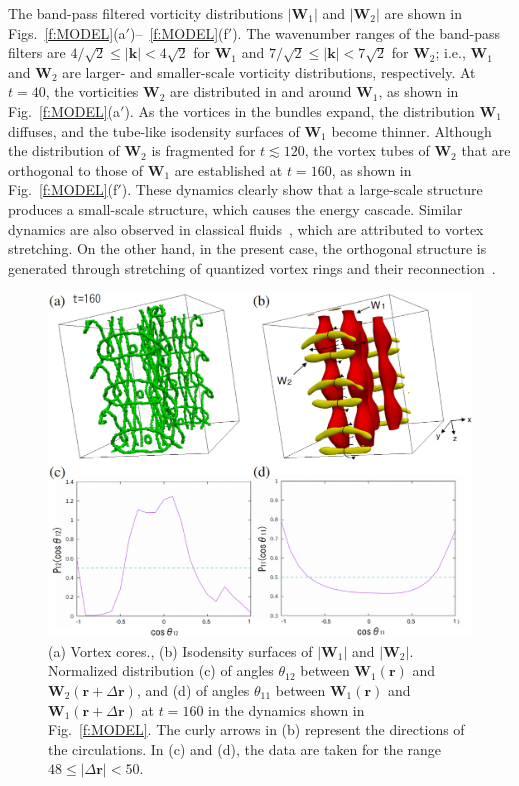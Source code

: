 \documentclass[aps,onecolumn,pra,longbibliography]{revtex4}
\begin{document}
	The band-pass filtered vorticity distributions
	$|\bm{W}_1|$ and $|\bm{W}_2|$ are shown
	in Figs.~\ref{f:MODEL}(a$'$)--~\ref{f:MODEL}(f$'$).
	The wavenumber ranges of the band-pass filters are
	$4/\sqrt{2}\leq |\bm{k}| <4\sqrt{2}$ for $\bm{W}_1$
	and $7/\sqrt{2}\leq |\bm{k}| < 7\sqrt{2}$ for $\bm{W}_2$;
	i.e., $\bm{W}_1$ and $\bm{W}_2$ are larger- and smaller-scale vorticity
	distributions, respectively.
	At $t=40$, the vorticities $\bm{W}_2$ are distributed in and around $\bm{W}_1$,
	as shown in Fig.~\ref{f:MODEL}(a$'$).
	As the vortices in the bundles expand, the distribution $\bm{W}_1$ diffuses,
	and the tube-like isodensity surfaces of $\bm{W}_1$ become thinner.
	Although the distribution of $\bm{W}_2$ is fragmented for $t \lesssim 120$,
	the vortex tubes of $\bm{W}_2$ that are orthogonal to those of $\bm{W}_1$ are
	established at $t=160$, as shown in Fig.~\ref{f:MODEL}(f$'$).
	These dynamics clearly show that a large-scale structure produces
	a small-scale structure, which causes the energy cascade.
	Similar dynamics are also observed in classical fluids~\cite{S.Goto2, M.V.Melander},
	which are attributed to vortex stretching.
	On the other hand, in the present case,
	the orthogonal structure is generated through
	stretching of quantized vortex rings and their reconnection~\cite{R.M.Kerr2}.
	\begin{figure}[t]
		\centering
		\includegraphics[width=16cm]{FIG3.eps}
		\caption{
			(a) Vortex cores., (b) Isodensity surfaces of $|\bm{W}_1|$ and $|\bm{W}_2|$.
			Normalized distribution (c) of angles $\theta_{12}$ between $\bm{W}_1(\bm{r})$ and
			$\bm{W}_2(\bm{r}+\Delta\bm{r})$,
			and (d) of angles $\theta_{11}$ between
			$\bm{W}_1(\bm{r})$ and $\bm{W}_1(\bm{r}+\Delta\bm{r})$ at $t=160$
			in the dynamics shown in Fig.~\ref{f:MODEL}.
			The curly arrows in (b) represent the directions of the circulations.
			In (c) and (d), the data are taken for the range $48 \leq |\Delta\bm{r}| < 50$.
		}
		\label{f:ORTHANT}
	\end{figure}
\end{document}
